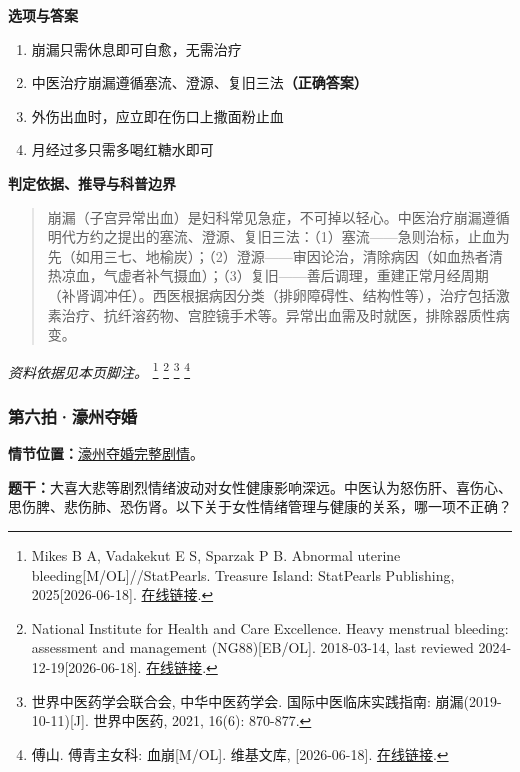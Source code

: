 \textbf{选项与答案}
\begin{enumerate}[label=\Alph*.,leftmargin=*]
  \item 崩漏只需休息即可自愈，无需治疗
  \item 中医治疗崩漏遵循塞流、澄源、复旧三法\textbf{（正确答案）}
  \item 外伤出血时，应立即在伤口上撒面粉止血
  \item 月经过多只需多喝红糖水即可
\end{enumerate}
\textbf{判定依据、推导与科普边界}
\begin{quote}崩漏（子宫异常出血）是妇科常见急症，不可掉以轻心。中医治疗崩漏遵循明代方约之提出的塞流、澄源、复旧三法：（1）塞流——急则治标，止血为先（如用三七、地榆炭）；（2）澄源——审因论治，清除病因（如血热者清热凉血，气虚者补气摄血）；（3）复旧——善后调理，重建正常月经周期（补肾调冲任）。西医根据病因分类（排卵障碍性、结构性等），治疗包括激素治疗、抗纤溶药物、宫腔镜手术等。异常出血需及时就医，排除器质性病变。\end{quote}
\noindent\textit{资料依据见本页脚注。}
\footnote{Mikes B A, Vadakekut E S, Sparzak P B. Abnormal uterine bleeding[M/OL]//StatPearls. Treasure Island: StatPearls Publishing, 2025[2026-06-18]. \href{https://www.ncbi.nlm.nih.gov/books/NBK532913/}{在线链接}.}
\footnote{National Institute for Health and Care Excellence. Heavy menstrual bleeding: assessment and management (NG88)[EB/OL]. 2018-03-14, last reviewed 2024-12-19[2026-06-18]. \href{https://www.nice.org.uk/guidance/ng88}{在线链接}.}
\footnote{世界中医药学会联合会, 中华中医药学会. 国际中医临床实践指南: 崩漏(2019-10-11)[J]. 世界中医药, 2021, 16(6): 870-877.}
\footnote{傅山. 傅青主女科: 血崩[M/OL]. 维基文库, [2026-06-18]. \href{https://zh.wikisource.org/zh-hans/傅青主女科}{在线链接}.}

\subsubsection{第六拍·濠州夺婚}\label{question:zhaomin:6}
\textbf{情节位置：}\hyperref[plot:zhaomin:6]{濠州夺婚完整剧情}。

\textbf{题干：}大喜大悲等剧烈情绪波动对女性健康影响深远。中医认为怒伤肝、喜伤心、思伤脾、悲伤肺、恐伤肾。以下关于女性情绪管理与健康的关系，哪一项不正确？

